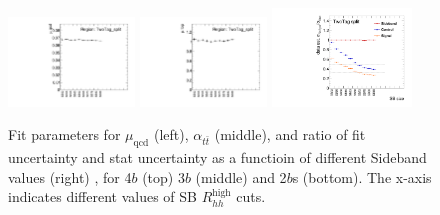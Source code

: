 \begin{figure}[htbp!]
\begin{center}
\includegraphics[width=0.3\textwidth,angle=-90]{figures/boosted/Appendix_SB/TwoTag_split_muqcdSB.pdf}
\includegraphics[width=0.3\textwidth,angle=-90]{figures/boosted/Appendix_SB/TwoTag_split_mutopSB.pdf}
\includegraphics[width=0.33\textwidth,angle=-90]{figures/boosted/Appendix_SB/data_est_TwoTag_split_sigma_compareSB.pdf}
  \caption{Fit parameters for $\mu_{\text{qcd}}$ (left), $\alpha_{t\bar{t}}$ (middle), and ratio of fit uncertainty and stat uncertainty as a functioin of different Sideband values (right) , for 4$b$ (top) 3$b$ (middle) and 2$b$s (bottom). The x-axis indicates different values of SB $R_{hh}^{\text{high}}$ cuts.}
  \label{fig:app-sb-muqcd-diffSB}
\end{center}
\end{figure}



